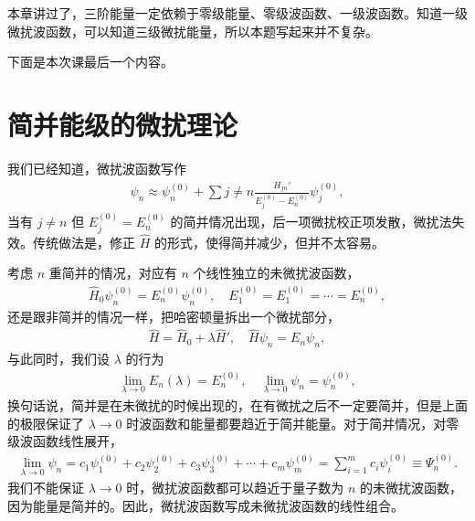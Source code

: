 本章讲过了，三阶能量一定依赖于零级能量、零级波函数、一级波函数。知道一级微扰波函数，可以知道三级微扰能量，所以本题写起来并不复杂。

下面是本次课最后一个内容。

\section{简并能级的微扰理论}
我们已经知道，微扰波函数写作
\begin{align}
    \psi_n \approx \psi_n^{(0)} + \sum{j\neq n } \frac{H_{jn}'}{E_j^{(0)} - E_n^{(0)}} \psi_j^{(0)},
\end{align}
当有 $j\neq n$ 但 $E_j^{(0)} = E_n^{(0)}$ 的简并情况出现，后一项微扰校正项发散，微扰法失效。传统做法是，修正 $\hat H$ 的形式，使得简并减少，但并不太容易。

考虑 $n$ 重简并的情况，对应有 $n$ 个线性独立的未微扰波函数，
\begin{align}
    \hat H_0 \psi_n^{(0)} = E_n^{(0)} \psi_n^{(0)}, \quad 
    E_1^{(0)} = E_1^{(0)} = \cdots = E_n^{(0)}, 
\end{align}
还是跟非简并的情况一样，把哈密顿量拆出一个微扰部分，
\begin{align}
    \hat H = \hat H_0 + \lambda \hat H', \quad \hat H \psi_n = E_n \psi_n, 
\end{align}
与此同时，我们设 $\lambda$ 的行为
\begin{align}
    \lim_{\lambda \rightarrow 0} E_n(\lambda) = E_n^{(0)}, \quad \lim_{\lambda \rightarrow 0} \psi_n = \psi_n^{(0)},
\end{align}
换句话说，简并是在未微扰的时候出现的，在有微扰之后不一定要简并，但是上面的极限保证了 $\lambda \rightarrow 0$ 时波函数和能量都要趋近于简并能量。对于简并情况，对零级波函数线性展开，
\begin{align}
    \lim_{\lambda \rightarrow 0} \psi_n = c_1 \psi_1^{(0)} + c_2 \psi_2^{(0)} + c_3 \psi_3^{(0)} + \cdots + c_m\psi_m^{(0)} = \sum_{i=1}^{m} c_i\psi_i^{(0)}\equiv\Psi_n^{(0)}. 
\end{align}
我们不能保证 $\lambda \rightarrow 0$ 时，微扰波函数都可以趋近于量子数为 $n$ 的未微扰波函数，因为能量是简并的。因此，微扰波函数写成未微扰波函数的线性组合。

